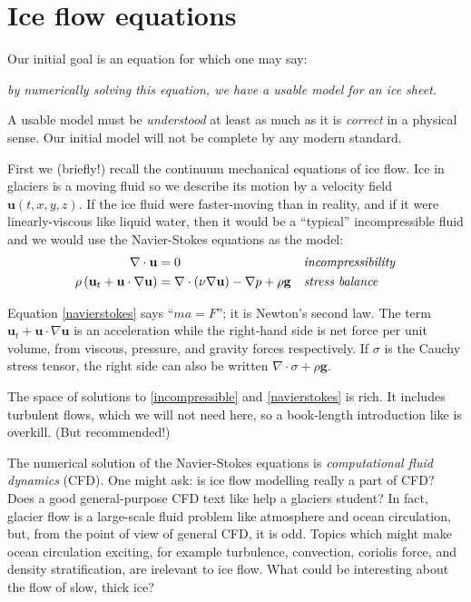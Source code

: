 \documentclass[letterpaper,final,12pt,reqno]{amsart}
\begin{document}
\section{Ice flow equations}  \label{sec:continuum}

Our initial goal is an equation for which one may say:
\begin{center}
\emph{by numerically solving this equation, we have a usable model for an ice sheet.}
\end{center}
A usable model must be \emph{understood} at least as much as it is \emph{correct} in a physical sense.  Our initial model will not be complete by any modern standard.

First we (briefly!) recall the continuum mechanical equations of ice flow.  Ice in glaciers is a moving fluid so we describe its motion by a velocity field $\mathbf{u}(t,x,y,z)$.  If the ice fluid were faster-moving than in reality, and if it were linearly-viscous like liquid water, then it would be a ``typical'' incompressible fluid and we would use the Navier-Stokes equations as the model:
\begin{align}
\nabla \cdot \mathbf{u} &= 0 &&\text{\emph{incompressibility}} \label{incompressible} \\
\rho \left(\mathbf{u}_t + \mathbf{u}\cdot\nabla \mathbf{u}\right) &= \nabla \cdot (\nu \nabla \mathbf{u}) - \nabla p + \rho \mathbf{g} &&\text{\emph{stress balance}} \label{navierstokes}
\end{align}

Equation \eqref{navierstokes} says ``$ma=F$''; it is Newton's second law.  The term $\mathbf{u}_t + \mathbf{u}\cdot\nabla \mathbf{u}$ is an acceleration while the right-hand side is net force per unit volume, from viscous, pressure, and gravity forces respectively.  If $\sigma$ is the Cauchy stress tensor, the right side can also be written $\nabla \cdot \sigma + \rho \mathbf{g}$.

The space of solutions to \eqref{incompressible} and \eqref{navierstokes} is rich.  It includes turbulent flows, which we will not need here, so a book-length introduction like \cite{Acheson} is overkill.  (But recommended!)

The numerical solution of the Navier-Stokes equations is \emph{computational fluid dynamics} (CFD).  One might ask: is ice flow modelling really a part of CFD?  Does a good general-purpose CFD text like \cite{Wesseling} help a glaciers student?  In fact, glacier flow is a large-scale fluid problem like atmosphere and ocean circulation, but, from the point of view of general CFD, it is odd.   Topics which might make ocean circulation exciting, for example turbulence, convection, coriolis force, and density stratification, are irelevant to ice flow.  What could be interesting about the flow of slow, thick ice?
\end{document}
